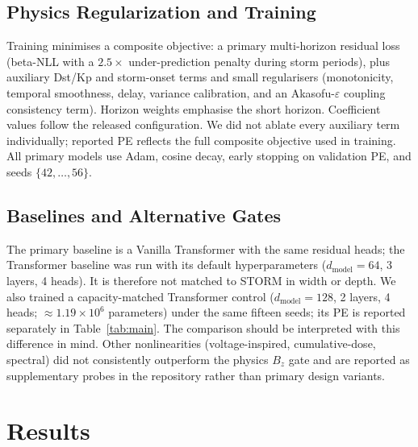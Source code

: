 \documentclass[conference]{IEEEtran}
\begin{document}
\subsection{Physics Regularization and Training}
Training minimises a composite objective: a primary multi-horizon residual loss (beta-NLL with a \(2.5\times\) under-prediction penalty during storm periods), plus auxiliary Dst/Kp and storm-onset terms and small regularisers (monotonicity, temporal smoothness, delay, variance calibration, and an Akasofu-\(\varepsilon\) coupling consistency term). Horizon weights emphasise the short horizon. Coefficient values follow the released configuration. We did not ablate every auxiliary term individually; reported PE reflects the full composite objective used in training. All primary models use Adam, cosine decay, early stopping on validation PE, and seeds \(\{42,\ldots,56\}\).

\subsection{Baselines and Alternative Gates}
The primary baseline is a Vanilla Transformer with the same residual heads; the Transformer baseline was run with its default hyperparameters ($d_{\mathrm{model}}=64$, 3 layers, 4 heads). It is therefore not matched to STORM in width or depth. We also trained a capacity-matched Transformer control ($d_{\mathrm{model}}=128$, 2 layers, 4 heads; $\approx1.19\times10^{6}$ parameters) under the same fifteen seeds; its PE is reported separately in Table~\ref{tab:main}. The comparison should be interpreted with this difference in mind. Other nonlinearities (voltage-inspired, cumulative-dose, spectral) did not consistently outperform the physics \(B_z\) gate and are reported as supplementary probes in the repository rather than primary design variants.

\section{Results}
\label{sec:results}
\end{document}
